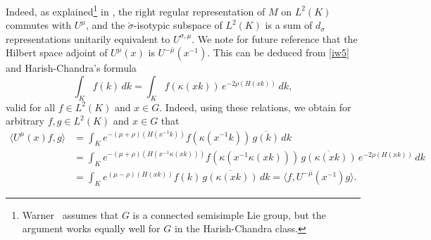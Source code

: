 \documentclass[11pt,oneside]{amsart}
\numberwithin{equation}{section}
\theoremstyle{remark}
\theoremstyle{plain}
\newcommand\ov{\overline}
\begin{document}
Indeed, as explained\footnote{Warner~\cite[p.~447]{W1} assumes that $G$ is a connected semisimple Lie group, but the argument works equally well for $G$ in the Harish-Chandra class.} in \cite[p.~447]{W1}, the right regular representation of $M$ on $L^2(K)$ commutes with $U^\mu$, and the $\check{\sigma}$-isotypic subspace of $L^2(K)$ is a sum of $d_\sigma$ representations unitarily equivalent to $U^{\sigma,\mu}$.
We note for future reference that the Hilbert space adjoint of $U^\mu(x)$ is $U^{-\bar\mu}(x^{-1})$. 
This can be deduced from \eqref{iw5} and Harish-Chandra's formula
\[\int_K f(k)\,dk=\int_K f(\kappa(xk))\,e^{-2\rho(H(xk))}\,dk,\]
valid for all $f\in L^2(K)$ and $x\in G$. Indeed, using these relations, we obtain for arbitrary $f,g\in L^2(K)$ and $x\in G$ that
\begin{align*}
\langle U^\mu(x)f,g\rangle
&=\int_K e^{-(\mu+\rho)(H(x^{-1}k))}f(\kappa(x^{-1}k))\,\ov{g(k)}\,dk\\
&=\int_K e^{-(\mu+\rho)(H(x^{-1}\kappa(xk)))}f(\kappa(x^{-1}\kappa(xk)))\,\ov{g(\kappa(xk))}\,e^{-2\rho(H(xk))}\,dk\\
&=\int_K e^{(\mu-\rho)(H(xk))}f(k)\,\ov{g(\kappa(xk))}\,dk=\langle f,U^{-\bar\mu}(x^{-1})g\rangle.
\end{align*}
\end{document}

